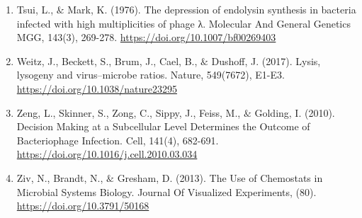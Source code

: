 \documentclass{article}
\begin{document}
\begin{enumerate}
\item	Tsui, L., $\&$ Mark, K. (1976). The depression of endolysin synthesis in bacteria infected with high multiplicities of phage λ. Molecular And General Genetics MGG, 143(3), 269-278. \url{https://doi.org/10.1007/bf00269403}

\item	Weitz, J., Beckett, S., Brum, J., Cael, B., $\&$ Dushoff, J. (2017). Lysis, lysogeny and virus–microbe ratios. Nature, 549(7672), E1-E3. \url{https://doi.org/10.1038/nature23295}

\item	Zeng, L., Skinner, S., Zong, C., Sippy, J., Feiss, M., $\&$ Golding, I. (2010). Decision Making at a Subcellular Level Determines the Outcome of Bacteriophage Infection. Cell, 141(4), 682-691. \url{https://doi.org/10.1016/j.cell.2010.03.034}

\item	Ziv, N., Brandt, N., $\&$ Gresham, D. (2013). The Use of Chemostats in Microbial Systems Biology. Journal Of Visualized Experiments, (80). \url{https://doi.org/10.3791/50168}
\end{enumerate}
\end{document}
